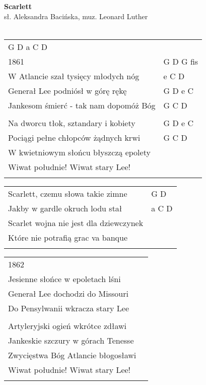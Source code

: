 \documentclass[a5paper]{article}
\begin{document}


\noindent
\fontsize{12pt}{15pt}\selectfont
\textbf{Scarlett} \\
\fontsize{8pt}{10pt}\selectfont
sł. Aleksandra Bacińska, muz. Leonard Luther \\ \\
\fontsize{10pt}{12pt}\selectfont
{}
\begin{tabular}{@{}p{8.50cm}p{3cm}@{}}
\noindent
G D a C D \\
1861 & G D G fis \\
W Atlancie szał tysięcy młodych nóg & e C D \\
Generał Lee podniósł w górę rękę & G D e C \\
Jankesom śmierć - tak nam dopomóż Bóg & G C D \\ \\
 
Na dworcu tłok, sztandary i kobiety & G D e C \\
Pociągi pełne chłopców żądnych krwi & G C D \\
W kwietniowym słońcu błyszczą epolety \\ 
Wiwat południe! Wiwat stary Lee! \\ \\
 
\end{tabular}

\noindent
\begin{tabular}{@{}p{7.50cm}p{3cm}@{}}
Scarlett, czemu słowa takie zimne & G D \\
Jakby w gardle okruch lodu stał & a C D \\
Scarlet wojna nie jest dla dziewczynek \\
Które nie potrafią grac va banque \\ \\
\end{tabular}

\noindent
\begin{tabular}{@{}p{7.50cm}p{3cm}@{}}
1862 \\
Jesienne słońce w epoletach lśni \\
Generał Lee dochodzi do Missouri \\
Do Pensylwanii wkracza stary Lee \\ \\
 
Artyleryjski ogień wkrótce zdławi \\
Jankeskie szczury w górach Tenesse \\
Zwycięstwa Bóg Atlancie błogosławi \\
Wiwat południe! Wiwat stary Lee! \\ \\
 
\end{tabular}
\end{document}
